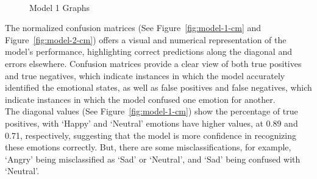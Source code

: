 \begin{figure}[H]
    \centering
    \qquad
    \vspace{0.5cm}
    \\
    \scriptsize{Model 1 Graphs}
\end{figure}
\indent The normalized confusion matrices (See Figure~\ref{fig:model-1-cm} and Figure~\ref{fig:model-2-cm}) offers a visual and numerical representation of the model's performance, highlighting correct predictions along the diagonal and errors elsewhere.
Confusion matrices provide a clear view of both true positives and true negatives, which indicate instances in which the model accurately identified the emotional states, as well as false positives and false negatives, which indicate instances in which the model confused one emotion for another.
\\
\indent The diagonal values (See Figure~\ref{fig:model-1-cm}) show the percentage of true positives, with `Happy' and `Neutral' emotions have higher values, at 0.89 and 0.71, respectively, suggesting that the model is more confidence in recognizing these emotions correctly.
But, there are some misclassifications, for example, `Angry' being misclassified as `Sad' or `Neutral', and `Sad' being confused with `Neutral'. 
